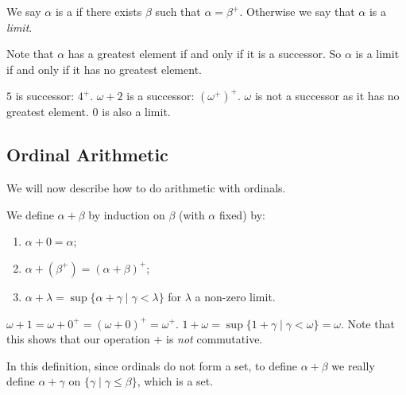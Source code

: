 \documentclass[a4paper]{scrartcl}
\begin{document}
\begin{definition}
  We say $\alpha$ is a  if there exists $\beta$ such that $\alpha = \beta^+$. Otherwise we say that $\alpha$ is a \emph{limit}.
\end{definition}

Note that $\alpha$ has a greatest element if and only if it is a successor. So $\alpha$ is a limit if and only if it has no greatest element. 

\begin{example}
  $5$ is successor: $4^+$. $\omega + 2$ is a successor: $(\omega^+)^+$. $\omega$ is not a successor as it has no greatest element. 0 is also a limit.
\end{example}

\subsection{Ordinal Arithmetic}

We will now describe how to do arithmetic with ordinals.

We define $\alpha + \beta$ by induction on $\beta$ (with $\alpha$ fixed) by:
\begin{enumerate}
  \item $\alpha + 0 = \alpha$;
  \item $\alpha + (\beta^+) = (\alpha + \beta)^+$;
  \item $\alpha + \lambda = \sup\{\alpha + \gamma \mid \gamma < \lambda\}$ for $\lambda$ a non-zero limit.
\end{enumerate}

\begin{example}
  $\omega + 1 = \omega + 0^+ = (\omega + 0)^+ = \omega^+$. $1 + \omega = \sup \{1 + \gamma \mid \gamma < \omega\} = \omega$. Note that this shows that our operation $+$ is \emph{not} commutative.
\end{example}

In this definition, since ordinals do not form a set, to define $\alpha + \beta$ we really define $\alpha + \gamma$ on $\{\gamma \mid \gamma \leq \beta\}$, which is a set. 
\end{document}
